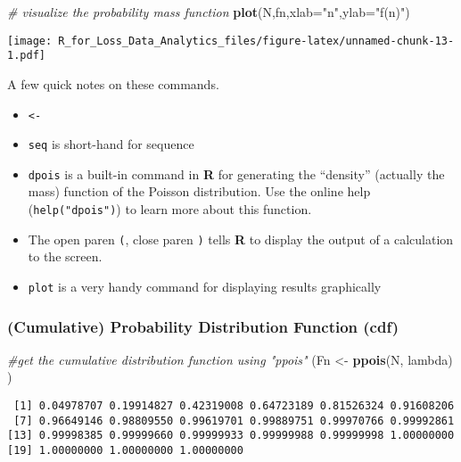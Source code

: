 \documentclass[]{book}
\newenvironment{Shaded}{\begin{snugshade}}{\end{snugshade}}
\newcommand{\KeywordTok}[1]{\textcolor[rgb]{0.13,0.29,0.53}{\textbf{#1}}}
\newcommand{\DataTypeTok}[1]{\textcolor[rgb]{0.13,0.29,0.53}{#1}}
\newcommand{\StringTok}[1]{\textcolor[rgb]{0.31,0.60,0.02}{#1}}
\newcommand{\CommentTok}[1]{\textcolor[rgb]{0.56,0.35,0.01}{\textit{#1}}}
\newcommand{\NormalTok}[1]{#1}
\providecommand{\tightlist}{%
  \setlength{\itemsep}{0pt}\setlength{\parskip}{0pt}}
\theoremstyle{definition}
\theoremstyle{definition}
\theoremstyle{definition}
\theoremstyle{remark}
\begin{document}
\begin{Shaded}
\begin{Highlighting}[]
\CommentTok{# visualize the probability mass function }
\KeywordTok{plot}\NormalTok{(N,fn,}\DataTypeTok{xlab=}\StringTok{"n"}\NormalTok{,}\DataTypeTok{ylab=}\StringTok{"f(n)"}\NormalTok{) }
\end{Highlighting}
\end{Shaded}

\texttt{[image: R\_for\_Loss\_Data\_Analytics\_files/figure-latex/unnamed-chunk-13-1.pdf]}

A few quick notes on these commands.

\begin{itemize}
\tightlist
\item
  \texttt{\textless{}-}
\item
  \texttt{seq} is short-hand for sequence
\item
  \texttt{dpois} is a built-in command in \textbf{R} for generating the
  ``density'' (actually the mass) function of the Poisson distribution.
  Use the online help (\texttt{help("dpois")}) to learn more about this
  function.
\item
  The open paren \texttt{(}, close paren \texttt{)} tells \textbf{R} to
  display the output of a calculation to the screen.
\item
  \texttt{plot} is a very handy command for displaying results
  graphically
\end{itemize}

\subsubsection{(Cumulative) Probability Distribution Function
(cdf)}\label{cumulative-probability-distribution-function-cdf}

\begin{Shaded}
\begin{Highlighting}[]
\CommentTok{#get the cumulative distribution function using "ppois"}
\NormalTok{(Fn <-}\StringTok{ }\KeywordTok{ppois}\NormalTok{(N, lambda) )}
\end{Highlighting}
\end{Shaded}

\begin{verbatim}
 [1] 0.04978707 0.19914827 0.42319008 0.64723189 0.81526324 0.91608206
 [7] 0.96649146 0.98809550 0.99619701 0.99889751 0.99970766 0.99992861
[13] 0.99998385 0.99999660 0.99999933 0.99999988 0.99999998 1.00000000
[19] 1.00000000 1.00000000 1.00000000
\end{verbatim}
\end{document}
